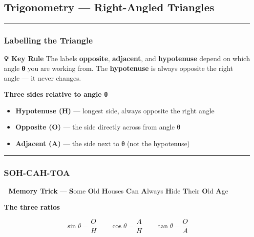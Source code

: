 \documentclass[
  letterpaper,
  DIV=11,
  numbers=noendperiod]{scrreprt}
\providecommand{\tightlist}{%
  \setlength{\itemsep}{0pt}\setlength{\parskip}{0pt}}
\theoremstyle{definition}
\theoremstyle{remark}
\begin{document}
\subsection*{Trigonometry --- Right-Angled
Triangles}\label{trigonometry-right-angled-triangles}

\begin{center}\rule{0.5\linewidth}{0.5pt}\end{center}

\subsubsection*{Labelling the Triangle}\label{labelling-the-triangle}

\textbf{💡 Key Rule} The labels \textbf{opposite}, \textbf{adjacent},
and \textbf{hypotenuse} depend on which angle \textbf{θ} you are working
from. The \textbf{hypotenuse} is always opposite the right angle --- it
never changes.

\textbf{Three sides relative to angle θ}

\begin{itemize}
\tightlist
\item
  \textbf{Hypotenuse (H)} --- longest side, always opposite the right
  angle
\item
  \textbf{Opposite (O)} --- the side directly across from angle θ
\item
  \textbf{Adjacent (A)} --- the side next to θ (not the hypotenuse)
\end{itemize}

\begin{center}\rule{0.5\linewidth}{0.5pt}\end{center}

\subsubsection*{SOH-CAH-TOA}\label{soh-cah-toa}

\textbf{🎯 Memory Trick} --- \textbf{S}ome \textbf{O}ld \textbf{H}ouses
\textbf{C}an \textbf{A}lways \textbf{H}ide \textbf{T}heir \textbf{O}ld
\textbf{A}ge

\textbf{The three ratios}

\[\sin\theta = \frac{O}{H} \qquad \cos\theta = \frac{A}{H} \qquad \tan\theta = \frac{O}{A}\]
\end{document}
